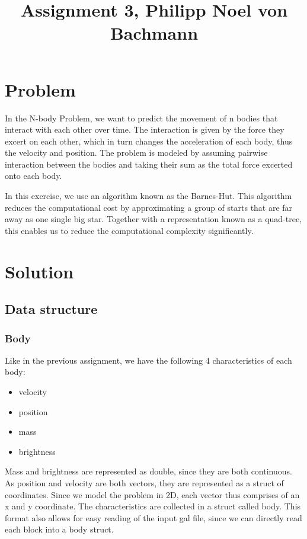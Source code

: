 \documentclass[a4paper]{scrartcl}
\title{Assignment 3, Philipp Noel von Bachmann}
\begin{document}
\maketitle

\section{Problem}
    In the N-body Problem, we want to predict the movement of n bodies that
    interact with each other over time. The interaction is given by the force
    they excert on each other, which in turn changes the acceleration of each
    body, thus the velocity and position. The problem is modeled by assuming
    pairwise interaction between the bodies and taking their sum as the total
    force excerted onto each body.

    In this exercise, we use an algorithm known as the Barnes-Hut. This
    algorithm reduces the computational cost by approximating a group of starts
    that are far away as one single big star. Together with a representation
    known as a quad-tree, this enables us to reduce the computational complexity
    significantly.

\section{Solution}
    \subsection{Data structure}
        \subsubsection{Body}
            Like in the previous assignment, we have the following 4 characteristics of each body:
            \begin{itemize}
                \item velocity
                \item position
                \item mass
                \item brightness
            \end{itemize}
            Mass and brightness are represented as double, since they are both
            continuous. As position and velocity are both vectors, they are
            represented as a struct of coordinates. Since we model the problem in
            2D, each vector thus comprises of an x and y coordinate. The
            characteristics are collected in a struct called body. This format
            also allows for easy reading of the input gal file, since we can
            directly read each block into a body struct.
\end{document}
